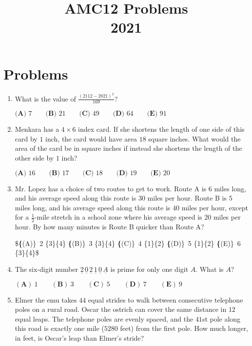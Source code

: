 \documentclass{article}
\title{AMC12 Problems \\ 2021}
\date{}
\begin{document}
\maketitle\thispagestyle{fancy}\newpage\section*{Problems}\begin{enumerate}[label=\arabic*., itemsep=0.5em]\item What is the value of $\frac{(2112-2021)^2}{169}$?

$\textbf{(A) } 7 \qquad\textbf{(B) } 21 \qquad\textbf{(C) } 49 \qquad\textbf{(D) } 64 \qquad\textbf{(E) } 91$\par \vspace{0.5em}\item Menkara has a $4 \times 6$ index card. If she shortens the length of one side of this card by $1$ inch, the card would have area $18$ square inches. What would the area of the card be in square inches if instead she shortens the length of the other side by $1$ inch?

$\textbf{(A) }16\qquad\textbf{(B) }17\qquad\textbf{(C) }18\qquad\textbf{(D) }19\qquad\textbf{(E) }20$\par \vspace{0.5em}\item Mr. Lopez has a choice of two routes to get to work. Route A is $6$ miles long, and his average speed along this route is $30$ miles per hour. Route B is $5$ miles long, and his average speed along this route is $40$ miles per hour, except for a $\frac{1}{2}$-mile stretch in a school zone where his average speed is $20$ miles per hour. By how many minutes is Route B quicker than Route A?

\$\textbf\{(A)\}\ 2 \frac\{3\}\{4\}  \qquad\textbf\{(B)\}\  3 \frac\{3\}\{4\} \qquad\textbf\{(C)\}\  4 \frac\{1\}\{2\} \qquad\textbf\{(D)\}\
 5 \frac\{1\}\{2\} \qquad\textbf\{(E)\}\ 6 \frac\{3\}\{4\}\$\par \vspace{0.5em}\item The six-digit number $\underline{2}\,\underline{0}\,\underline{2}\,\underline{1}\,\underline{0}\,\underline{A}$ is prime for only one digit $A.$ What is $A?$

$(\textbf{A})\: 1\qquad(\textbf{B}) \: 3\qquad(\textbf{C}) \: 5 \qquad(\textbf{D}) \: 7\qquad(\textbf{E}) \: 9$\par \vspace{0.5em}\item Elmer the emu takes $44$ equal strides to walk between consecutive telephone poles on a rural road. Oscar the ostrich can cover the same distance in $12$ equal leaps. The telephone poles are evenly spaced, and the $41$st pole along this road is exactly one mile ($5280$ feet) from the first pole. How much longer, in feet, is Oscar's leap than Elmer's stride?


\end{enumerate}
\end{document}
